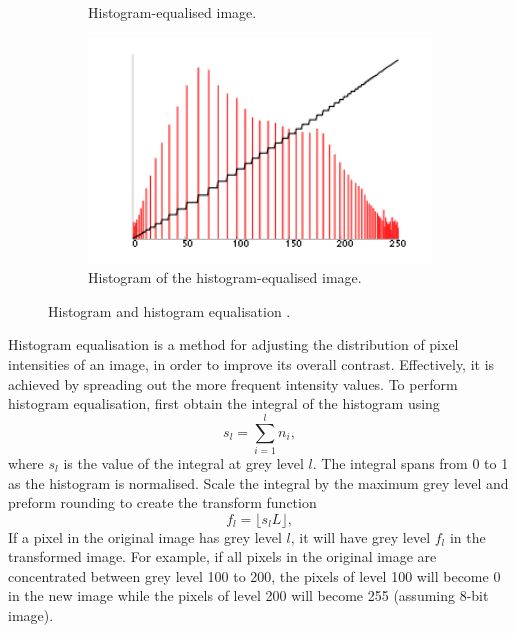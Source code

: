 \documentclass[conference]{IEEEtran}
\begin{document}
\begin{figure}[htbp]
\begin{subfigure}{0.4\textwidth}
        \caption{Histogram-equalised image.}
        \label{C equalised}
    \end{subfigure}
    \begin{subfigure}{0.4\textwidth}
        \centering
        \includegraphics[width=1\textwidth]{Images/C equalised histogram.png}
        \caption{Histogram of the histogram-equalised image.}
        \label{C equalised histogram}
    \end{subfigure}
    \caption{Histogram and histogram equalisation \cite{Histogram equalisation wiki}.}
    \label{Histogram and histogram equalisation}
\end{figure}

Histogram equalisation is a method for adjusting the distribution of pixel intensities of an image, in order to improve its overall contrast. Effectively, it is achieved by spreading out the more frequent intensity values. To perform histogram equalisation, first obtain the integral of the histogram using
\[s_l = \sum_{i=1}^{l} n_i,\]
where $s_l$ is the value of the integral at grey level $l$. The integral spans from 0 to 1 as the histogram is normalised. Scale the integral by the maximum grey level and preform rounding to create the transform function
\begin{equation}
    f_l = \lfloor s_lL \rfloor,
    \label{Histogram equalisation transform function}
\end{equation}
If a pixel in the original image has grey level $l$, it will have grey level $f_l$ in the transformed image. For example, if all pixels in the original image are concentrated between grey level 100 to 200, the pixels of level 100 will become 0 in the new image while the pixels of level 200 will become 255 (assuming 8-bit image).
\end{document}
